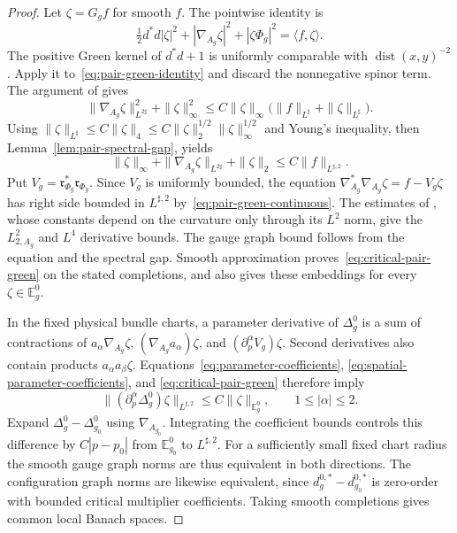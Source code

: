\documentclass[11pt]{amsart}
\theoremstyle{definition}
\theoremstyle{remark}
\theoremstyle{plain}
\begin{document}
\begin{proof}
Let $\zeta=G_gf$ for smooth $f$.  The pointwise identity is
\begin{equation}\label{eq:pair-green-identity}
 \tfrac12d^*d|\zeta|^2+|\nabla_{A_g}\zeta|^2+
 |\zeta\Phi_g|^2=\langle f,\zeta\rangle.
\end{equation}
The positive Green kernel of $d^*d+1$ is uniformly comparable with
$\operatorname{dist}(x,y)^{-2}$
\cite[Lemma~5.1]{FeehanCritical}.  Apply it
to~\eqref{eq:pair-green-identity} and discard the nonnegative spinor
term.  The argument of \cite[Lemma~5.3]{FeehanCritical} gives
\[
 \|\nabla_{A_g}\zeta\|_{L^{2\sharp}}^2+\|\zeta\|_\infty^2
 \leq C\|\zeta\|_\infty
       \bigl(\|f\|_{L^\sharp}+\|\zeta\|_{L^\sharp}\bigr).
\]
Using
$\|\zeta\|_{L^\sharp}\leq C\|\zeta\|_4
 \leq C\|\zeta\|_2^{1/2}\|\zeta\|_\infty^{1/2}$
and Young's inequality, then Lemma~\ref{lem:pair-spectral-gap}, yields
\begin{equation}\label{eq:pair-green-continuous}
 \|\zeta\|_\infty+\|\nabla_{A_g}\zeta\|_{L^{2\sharp}}
 +\|\zeta\|_2\leq C\|f\|_{L^{\sharp,2}}.
\end{equation}
Put $V_g=\mathfrak r_{\Phi_g}^*\mathfrak r_{\Phi_g}$.
Since $V_g$ is uniformly bounded, the equation
$\nabla_{A_g}^*\nabla_{A_g}\zeta=f-V_g\zeta$ has right side bounded
in $L^{\sharp,2}$ by~\eqref{eq:pair-green-continuous}.
The estimates of \cite[Lemmas~5.4--5.5]{FeehanCritical}, whose constants
depend on the curvature only through its $L^2$ norm, give the
$L^2_{2,A_g}$ and $L^4$ derivative bounds.
The gauge graph bound follows from the equation and the spectral gap.
Smooth approximation proves~\eqref{eq:critical-pair-green} on the stated
completions, and also gives these embeddings for every
$\zeta\in\mathbb E_g^0$.

In the fixed physical bundle charts, a parameter derivative of
$\Delta_g^0$ is a sum of contractions of
$a_\alpha\nabla_{A_g}\zeta$, $(\nabla_{A_g}a_\alpha)\zeta$,
and $(\partial_p^\alpha V_g)\zeta$.
Second derivatives also contain products $a_\alpha a_\beta\zeta$.
Equations~\eqref{eq:parameter-coefficients},
\eqref{eq:spatial-parameter-coefficients}, and
\eqref{eq:critical-pair-green} therefore imply
\begin{equation}\label{eq:pair-laplacian-derivatives}
 \|(\partial_p^\alpha\Delta_g^0)\zeta\|_{L^{\sharp,2}}
 \leq C\|\zeta\|_{\mathbb E_g^0},\qquad 1\leq|\alpha|\leq2.
\end{equation}
Expand $\Delta_g^0-\Delta_{g_0}^0$ using $\nabla_{A_{g_0}}$.
Integrating the coefficient bounds controls this difference by
$C|p-p_0|$ from $\mathbb E_{g_0}^0$ to $L^{\sharp,2}$.
For a sufficiently small fixed chart radius the smooth gauge graph
norms are thus equivalent in both directions.  The configuration graph
norms are likewise equivalent, since $d_g^{0,*}-d_{g_0}^{0,*}$
is zero-order with bounded critical multiplier coefficients.
Taking smooth completions gives common local Banach spaces.


\end{proof}
\end{document}
